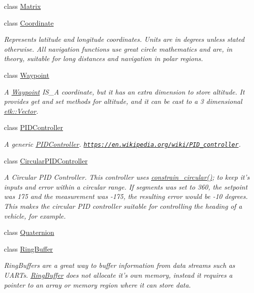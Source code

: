 \begin{DoxyCompactItemize}
class \hyperlink{classetk_1_1_matrix}{Matrix}
\item 
class \hyperlink{classetk_1_1_coordinate}{Coordinate}
\begin{DoxyCompactList}\small\item\em Represents latitude and longitude coordinates. Units are in degrees unless stated otherwise. All navigation functions use great circle mathematics and are, in theory, suitable for long distances and navigation in polar regions. \end{DoxyCompactList}\item 
class \hyperlink{classetk_1_1_waypoint}{Waypoint}
\begin{DoxyCompactList}\small\item\em A \hyperlink{classetk_1_1_waypoint}{Waypoint} I\-S\-\_\-\-A coordinate, but it has an extra dimension to store altitude. It provides get and set methods for altitude, and it can be cast to a 3 dimensional \hyperlink{classetk_1_1_vector}{etk\-::\-Vector}. \end{DoxyCompactList}\item 
class \hyperlink{classetk_1_1_p_i_d_controller}{P\-I\-D\-Controller}
\begin{DoxyCompactList}\small\item\em A generic \hyperlink{classetk_1_1_p_i_d_controller}{P\-I\-D\-Controller}. \href{https://en.wikipedia.org/wiki/PID_controller}{\tt https\-://en.\-wikipedia.\-org/wiki/\-P\-I\-D\-\_\-controller}. \end{DoxyCompactList}\item 
class \hyperlink{classetk_1_1_circular_p_i_d_controller}{Circular\-P\-I\-D\-Controller}
\begin{DoxyCompactList}\small\item\em A Circular P\-I\-D Controller. This controller uses \hyperlink{namespaceetk_a0bb96bed2b97ddb4eba560684c0e050a}{constrain\-\_\-circular()}; to keep it's inputs and error within a circular range. If segments was set to 360, the setpoint was 175 and the measurement was -\/175, the resulting error would be -\/10 degrees. This makes the circular P\-I\-D controller suitable for controlling the heading of a vehicle, for example. \end{DoxyCompactList}\item 
class \hyperlink{classetk_1_1_quaternion}{Quaternion}
\item 
class \hyperlink{classetk_1_1_ring_buffer}{Ring\-Buffer}
\begin{DoxyCompactList}\small\item\em Ring\-Buffers are a great way to buffer information from data streams such as U\-A\-R\-Ts. \hyperlink{classetk_1_1_ring_buffer}{Ring\-Buffer} does not allocate it's own memory, instead it requires a pointer to an array or memory region where it can store data. \par

\end{DoxyCompactList}
\end{DoxyCompactItemize}
